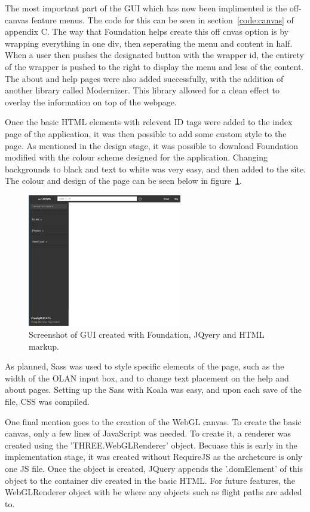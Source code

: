 The most important part of the GUI which has now been implimented is the off-canvas feature menus. The code for this can be seen in section~\ref{code:canvas} of appendix C. The way that Foundation helps create this off cnvas option is by wrapping everything in one div, then seperating the menu and content in half. When a user then pushes the designated button with the wrapper id, the entirety of the wrapper is pushed to the right to display the menu and less of the content. The about and help pages were also added successfully, with the addition of another library called Modernizer. This library allowed for a clean effect to overlay the information on top of the webpage.

Once the basic HTML elements with relevent ID tags were added to the index page of the application, it was then possible to add some custom style to the page. As mentioned in the design stage, it was possible to download Foundation modified with the colour scheme designed for the application. Changing backgrounds to black and text to white was very easy, and then added to the site. The colour and design of the page can be seen below in figure~\ref{fig:newgui}.

\begin{figure}[h]
  \centering
      \includegraphics[width=0.6\textwidth]{images/desktopProgress.png}
  \caption{Screenshot of GUI created with Foundation, JQyery and HTML markup.}
  \label{fig:newgui}
\end{figure}

As planned, Sass was used to style specific elements of the page, such as the width of the OLAN input box, and to change text placement on the help and about pages. Setting up the Sass with Koala was easy, and upon each save of the file, CSS was compiled. 

One final mention goes to the creation of the WebGL canvas. To create the basic canvas, only a few lines of JavaScript was needed. To create it, a renderer was created using  the 'THREE.WebGLRenderer' object. Becuase this is early in the implementation stage, it was created without RequireJS as the archetcure is only one JS file. Once the object is created, JQuery appends the '.domElement' of this object to the container div created in the basic HTML. For future features, the WebGLRenderer object with be where any objects such as flight paths are added to.

